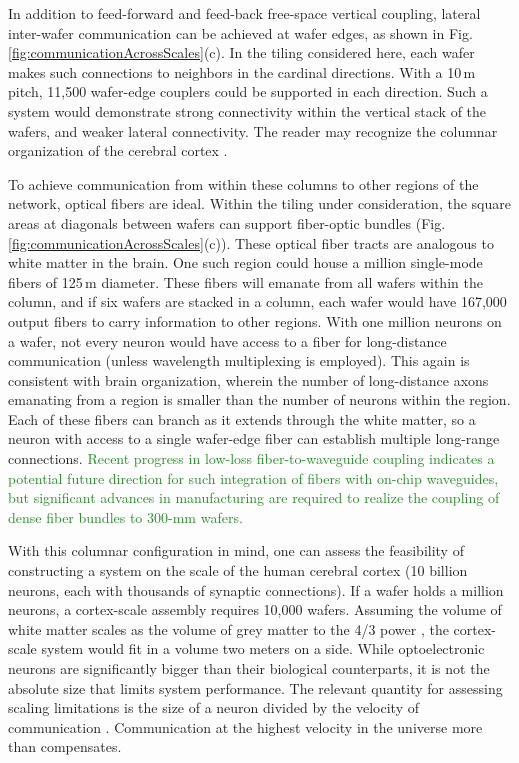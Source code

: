 \documentclass{article}
\begin{document}
\begin{multicols}{2}
In addition to feed-forward and feed-back free-space vertical coupling, lateral inter-wafer communication can be achieved at wafer edges, as shown in Fig.\,\ref{fig:communicationAcrossScales}(c). In the tiling considered here, each wafer makes such connections to neighbors in the cardinal directions. With a 10\,\textmu m pitch, 11,500 wafer-edge couplers could be supported in each direction. Such a system would demonstrate strong connectivity within the vertical stack of the wafers, and weaker lateral connectivity. The reader may recognize the columnar organization of the cerebral cortex \cite{mo1997}.

To achieve communication from within these columns to other regions of the network, optical fibers are ideal. Within the tiling under consideration, the square areas at diagonals between wafers can support fiber-optic bundles (Fig.\,\ref{fig:communicationAcrossScales}(c)). These optical fiber tracts are analogous to white matter in the brain. One such region could house a million single-mode fibers of 125\,\textmu m diameter. These fibers will emanate from all wafers within the column, and if six wafers are stacked in a column, each wafer would have 167,000 output fibers to carry information to other regions. With one million neurons on a wafer, not every neuron would have access to a fiber for long-distance communication (unless wavelength multiplexing is employed). This again is consistent with brain organization, wherein the number of long-distance axons emanating from a region is smaller than the number of neurons within the region. Each of these fibers can branch as it extends through the white matter, so a neuron with access to a single wafer-edge fiber can establish multiple long-range connections. \textcolor{ForestGreen}{Recent progress in low-loss fiber-to-waveguide coupling \cite{khbu2020} indicates a potential future direction for such integration of fibers with on-chip waveguides, but significant advances in manufacturing are required to realize the coupling of dense fiber bundles to 300-mm wafers.}

With this columnar configuration in mind, one can assess the feasibility of constructing a system on the scale of the human cerebral cortex (10 billion neurons, each with thousands of synaptic connections). If a wafer holds a million neurons, a cortex-scale assembly requires 10,000 wafers. Assuming the volume of white matter scales as the volume of grey matter to the 4/3 power \cite{zhse2000}, the cortex-scale system would fit in a volume two meters on a side. While optoelectronic neurons are significantly bigger than their biological counterparts, it is not the absolute size that limits system performance. The relevant quantity for assessing scaling limitations is the size of a neuron divided by the velocity of communication \cite{sh2019}. Communication at the highest velocity in the universe more than compensates. 


\end{multicols}
\end{document}
